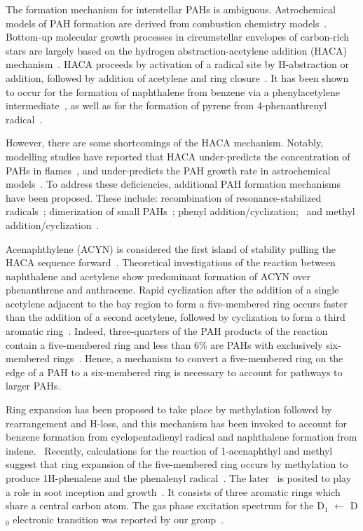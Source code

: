\documentclass[journal=jacsat,manuscript=article,layout=onecolumn]{achemso}
\begin{document}
The formation mechanism for interstellar PAHs is ambiguous. Astrochemical models of PAH formation are derived from combustion chemistry models~\cite{fre89}. Bottom-up molecular growth processes in circumstellar envelopes of carbon-rich stars are largely based on the hydrogen abstraction-acetylene addition (HACA) mechanism~\cite{tie13}. HACA proceeds by activation of a radical site by H-abstraction or addition, followed by addition of acetylene and ring closure~\cite{fre85}.  It has been shown to occur for the formation of naphthalene from benzene via a phenylacetylene intermediate~\cite{par14,yan16}, as well as for the formation of pyrene from 4-phenanthrenyl radical~\cite{zha18}.

However, there are some shortcomings of the HACA mechanism. Notably, modelling studies have reported that HACA under-predicts the concentration of PAHs in flames~\cite{raj12}, and under-predicts the PAH growth rate in astrochemical models~\cite{mic10a,mic10b,mic11}. To address these deficiencies, additional PAH formation mechanisms have been proposed. These include: recombination of resonance-stabilized radicals~\cite{mel96,mil92,joh18}; dimerization of small PAHs~\cite{sie00}; phenyl addition/cyclization;~\cite{shu08} and methyl addition/cyclization~\cite{shu10}. %

Acenaphthylene (ACYN) is considered the first island of stability pulling the HACA sequence forward~\cite{fre20}. Theoretical investigations of the reaction between naphthalene and acetylene show predominant formation of ACYN over phenanthrene and anthracene. Rapid cyclization after the addition of a single acetylene adjacent to the bay region to form a five-membered ring occurs faster than the addition of a second acetylene, followed by cyclization to form a third aromatic ring~\cite{kis13}. Indeed, three-quarters of the PAH products of the reaction contain a five-membered ring and less than 6\% are PAHs with exclusively six-membered rings~\cite{kis13}. Hence, a mechanism to convert a five-membered ring on the edge of a PAH to a six-membered ring is necessary to account for pathways to larger PAHs. %

Ring expansion has been proposed to take place by methylation followed by rearrangement and H-loss, and this mechanism has been invoked to account for benzene formation from cyclopentadienyl radical and naphthalene formation from indene.~\cite{mel96,mos96,sha09,meb16,jas13,zha19,meb17} Recently, calculations for the reaction of 1-acenaphthyl and methyl suggest that ring expansion of the five-membered ring occurs by methylation to produce 1H-phenalene and the phenalenyl radical~\cite{por20}. The later~\cite{mor11,oco17} is posited to play a role in soot inception and growth~\cite{joh18}. It consists of three aromatic rings which share a central carbon atom. The gas phase excitation spectrum for the D$_1$ $\leftarrow$ D$_0$ electronic transition was reported by our group~\cite{oco11}.
\end{document}
